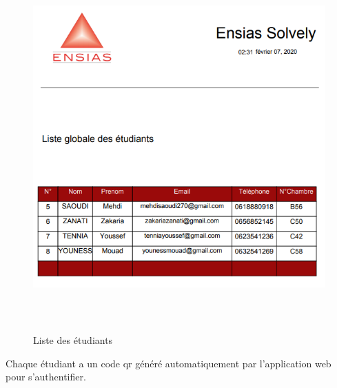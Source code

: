 \documentclass[11.5pt]{report}
\begin{document}
\begin{figure}[h]
	
	\begin{center}
		\includegraphics[width=500pt,height=400pt]{studentslist.png} 
		\caption{Liste des étudiants}
	\end{center}
	
\end{figure}
\newpage
Chaque étudiant a un code qr généré automatiquement par l'application web pour s'authentifier.\\
\end{document}
